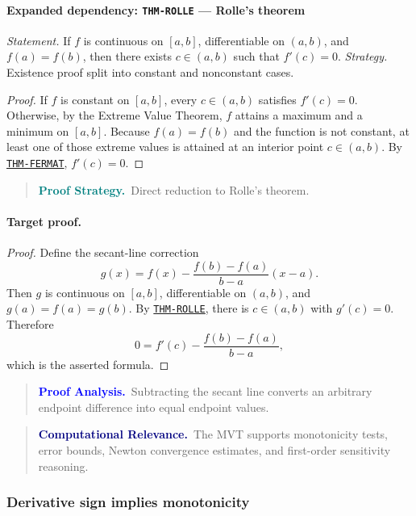 \documentclass[10pt]{article}
\newcommand{\pidraw}[1]{\begingroup\urlstyle{tt}\nolinkurl{#1}\endgroup}
\newcommand{\pidref}[1]{\hyperref[prf:#1]{\pidraw{#1}}}
\newcommand{\pid}[1]{\pidref{#1}}
\theoremstyle{definition}
\theoremstyle{remark}
\newenvironment{proofstrategy}
{\begin{quote}\small\noindent\textbf{\textcolor{teal}{Proof Strategy.}}\ }
{\end{quote}}
\newenvironment{proofanalysis}
{\begin{quote}\small\noindent\textbf{\textcolor{blue}{Proof Analysis.}}\ }
{\end{quote}}
\newenvironment{computationalrelevance}
{\begin{quote}\small\noindent\textbf{\textcolor{navy}{Computational Relevance.}}\ }
{\end{quote}}
\begin{document}
\paragraph{Expanded dependency: \pidraw{THM-ROLLE} --- Rolle's theorem}
\textit{Statement.} If $f$ is continuous on $[a,b]$, differentiable on $(a,b)$, and $f(a)=f(b)$, then there exists $c\in(a,b)$ such that $f'(c)=0$.
\textit{Strategy.} Existence proof split into constant and nonconstant cases.
\begin{proof}If $f$ is constant on $[a,b]$, every $c\in(a,b)$ satisfies $f'(c)=0$.
Otherwise, by the Extreme Value Theorem, $f$ attains a maximum and a minimum
on $[a,b]$. Because $f(a)=f(b)$ and the function is not constant, at least one
of those extreme values is attained at an interior point $c\in(a,b)$.
By \pid{THM-FERMAT}, $f'(c)=0$.\end{proof}

\begin{proofstrategy}Direct reduction to Rolle's theorem.\end{proofstrategy}

\paragraph{Target proof.}

\begin{proof}

Define the secant-line correction
\[
g(x)=f(x)-\frac{f(b)-f(a)}{b-a}(x-a).
\]
Then $g$ is continuous on $[a,b]$, differentiable on $(a,b)$, and
$g(a)=f(a)=g(b)$. By \pid{THM-ROLLE}, there is $c\in(a,b)$ with $g'(c)=0$.
Therefore
\[
0=f'(c)-\frac{f(b)-f(a)}{b-a},
\]
which is the asserted formula.

\end{proof}

\begin{proofanalysis}Subtracting the secant line converts an arbitrary endpoint difference into equal endpoint values.\end{proofanalysis}

\begin{computationalrelevance}The MVT supports monotonicity tests, error bounds, Newton convergence estimates, and first-order sensitivity reasoning.\end{computationalrelevance}

\subsubsection{Derivative sign implies monotonicity}
\end{document}
